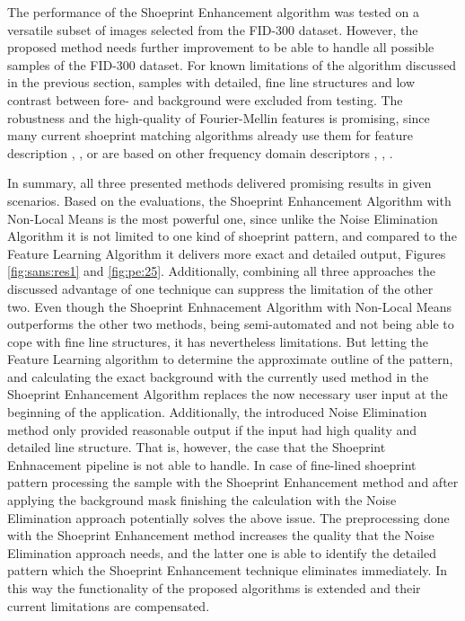 \documentclass[draft,final]{vutinfth} %
\begin{document}
The performance of the Shoeprint Enhancement  algorithm was tested on a versatile subset of images selected from the FID-300 dataset.
However, the proposed method needs further improvement to be able to handle all possible samples of the FID-300 dataset.
For known limitations of the algorithm discussed in the previous section, samples with detailed, fine line structures and low contrast between fore- and background were excluded from testing.
The robustness and the high-quality of Fourier-Mellin features is promising, since many current shoeprint matching algorithms already use them for feature description  \cite{gueham2008automatic}, \cite{richetelli2017classification}, \cite{wu2019crime} or are based on other frequency domain descriptors \cite{algarni2008novel}, \cite{wang2014automatic}, \cite{katireddy2017novel}. 
\par
In summary, all three presented methods delivered promising results in given scenarios.
Based on the evaluations, the Shoeprint Enhancement Algorithm with Non-Local Means is the most powerful one, since unlike the Noise Elimination Algorithm it is not limited to one kind of shoeprint pattern, and compared to the Feature Learning Algorithm it delivers more exact and detailed output, Figures \ref{fig:sans:res1} and \ref{fig:pe:25}.
Additionally, combining all three approaches the discussed advantage of one technique can suppress the limitation of the other two.
Even though the Shoeprint Enhnacement Algorithm with Non-Local Means outperforms the other two methods, being semi-automated and not being able to cope with fine line structures, it has nevertheless limitations. 
But letting the Feature Learning algorithm to determine the approximate outline of the pattern, and calculating the exact background with the currently used method in the Shoeprint Enhancement Algorithm replaces the now necessary user input at the beginning of the application.
Additionally, the introduced Noise Elimination method only provided reasonable output if the input had high quality and detailed line structure.
That is, however, the case that the Shoeprint Enhnacement pipeline is not able to handle. 
In case of fine-lined shoeprint pattern processing the sample with the Shoeprint Enhancement method and after applying the background mask finishing the calculation with the Noise Elimination approach potentially solves the above issue.
The preprocessing done with the Shoeprint Enhancement method increases the quality that the Noise Elimination approach needs, and the latter one is able to identify the detailed pattern which the Shoeprint Enhancement technique eliminates immediately.
In this way the functionality of the proposed algorithms is extended and their current limitations are compensated.
\end{document}
